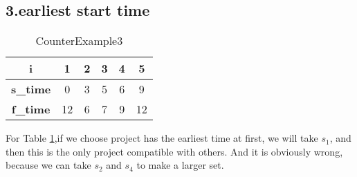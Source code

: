 \documentclass[oneside]{homework} %
\begin{document}
\subsection*{3.earliest start time}
\begin{table}[h]
  \centering
  \begin{tabular}{|c|c|c|c|c|c|}
	\hline
	\textbf{i} & 1 & 2& 3& 4& 5 \\
	\hline
	\textbf{s\_time} & 0 & 3& 5& 6& 9 \\
	\hline
	\textbf{f\_time} & 12 & 6& 7& 9& 12 \\
	\hline
  \end{tabular}
  \caption{CounterExample3}
  \label{tab:ce3}
\end{table}
For Table \ref{tab:ce3},if we choose project has the earliest time at first, we will take $s_{1}$, and then this is the only project compatible with others. And it is obviously wrong, because we can take $s_{2}$ and $s_{4}$ to make a larger set.
\end{document}
